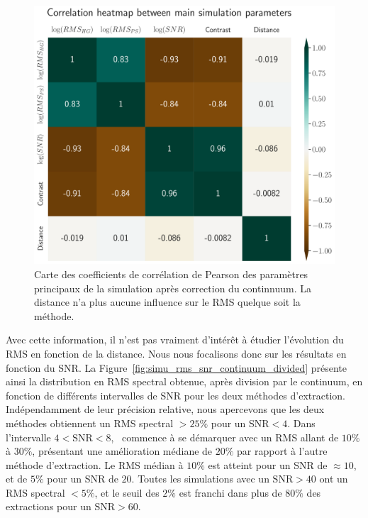 \documentclass[../main/main.tex]{subfiles}
\begin{document}
\begin{figure}[ht]
  \begin{minipage}[c]{0.6\textwidth}
    \includegraphics[width=\textwidth]{../figures/08_simu/corrheatmap_simu_params.pdf}
  \end{minipage}\hfill
  \begin{minipage}[c]{0.38\textwidth}
    \caption[Corrélation des paramètres de la
    simulation (continuum corrigé).]{Carte des coefficients de corrélation de Pearson des
      paramètres principaux de la
    simulation après correction du continnuum. La distance n'a plus
    aucune influence sur le RMS quelque soit la méthode.}\label{fig:corrheatmap_simuparams}
  \end{minipage}
\end{figure}

Avec cette information, il n'est pas vraiment d'intérêt à étudier
l'évolution du RMS en fonction de la distance. Nous nous focalisons donc
sur les résultats en fonction du SNR. La
Figure~\ref{fig:simu_rms_snr_continuum_divided} présente ainsi la
distribution en RMS spectral obtenue, après division par le continuum, en fonction de différents
intervalles de SNR pour les deux méthodes d'extraction. Indépendamment
de leur précision relative, nous apercevons que les deux méthodes
obtiennent un RMS spectral $>25\%$ pour un SNR$<4$. Dans l'intervalle
$4<\text{SNR}<8$, \hypergal\ commence à se démarquer avec un RMS allant
de $10\%$ à $30\%$, présentant une amélioration médiane de $20\%$ par
rapport à l'autre méthode d'extraction.  Le RMS médian à $10\%$ est
atteint pour un SNR de $\approx10$, et de $5\%$ pour un SNR de
$20$. Toutes les simulations avec un $\text{SNR}>40$ ont un RMS spectral
$<5\%$, et le seuil des $2\%$ est franchi dans plus de $80\%$ des
extractions pour un $\text{SNR}>60$.
\end{document}
